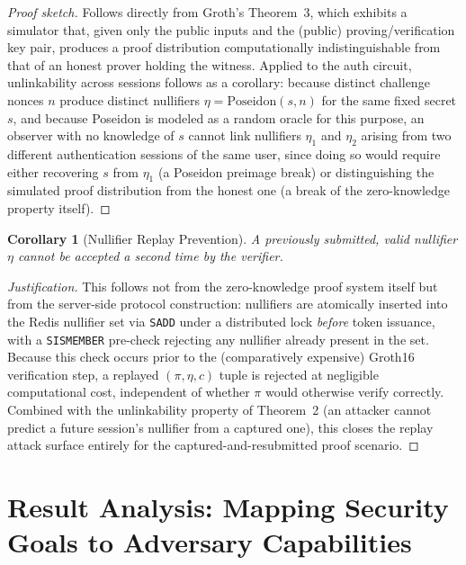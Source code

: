 \documentclass[12pt,a4paper,oneside]{report}
\newtheorem{corollary}{Corollary}[chapter]
\begin{document}
\begin{proof}[Proof sketch]
Follows directly from Groth's Theorem~3, which exhibits a simulator that,
given only the public inputs and the (public) proving/verification key
pair, produces a proof distribution computationally indistinguishable
from that of an honest prover holding the witness. Applied to the auth
circuit, unlinkability across sessions follows as a corollary: because
distinct challenge nonces $n$ produce distinct nullifiers
$\eta = \mathrm{Poseidon}(s, n)$ for the same fixed secret $s$, and
because Poseidon is modeled as a random oracle for this purpose, an
observer with no knowledge of $s$ cannot link nullifiers $\eta_1$ and
$\eta_2$ arising from two different authentication sessions of the same
user, since doing so would require either recovering $s$ from $\eta_1$
(a Poseidon preimage break) or distinguishing the simulated proof
distribution from the honest one (a break of the zero-knowledge property
itself).
\end{proof}

\begin{corollary}[Nullifier Replay Prevention]
A previously submitted, valid nullifier $\eta$ cannot be accepted a
second time by the verifier.
\end{corollary}

\begin{proof}[Justification]
This follows not from the zero-knowledge proof system itself but from the
server-side protocol construction: nullifiers are atomically inserted
into the Redis nullifier set via \texttt{SADD} under a distributed lock
\emph{before} token issuance, with a \texttt{SISMEMBER} pre-check
rejecting any nullifier already present in the set. Because this check
occurs prior to the (comparatively expensive) Groth16 verification step,
a replayed $(\pi, \eta, c)$ tuple is rejected at negligible computational
cost, independent of whether $\pi$ would otherwise verify correctly.
Combined with the unlinkability property of Theorem~2 (an attacker cannot
predict a future session's nullifier from a captured one), this closes
the replay attack surface entirely for the captured-and-resubmitted proof
scenario.
\end{proof}

\section{Result Analysis: Mapping Security Goals to Adversary Capabilities}
\label{sec:result_analysis}
\end{document}
